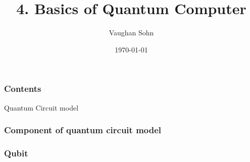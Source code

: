 \documentclass[9pt]{beamer}
\title{4. Basics of Quantum Computer}
\date{\today}
\author{Vaughan Sohn}
\begin{document}
    \maketitle
    
    \begin{frame}
        \frametitle{Contents}
        \tableofcontents
    \end{frame}


    \begin{section}{Quantum Circuit model}
        \begin{frame}
            \frametitle{Component of quantum circuit model}
        
        \end{frame}

        \begin{frame}
            \frametitle{Qubit}
        
        \end{frame}
        
    \end{section}
\end{document}
